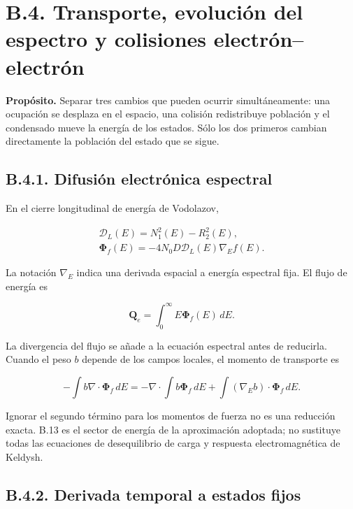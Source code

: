 \documentclass[
  spanish,
  10pt,
  a4paper,
]{article}
\begin{document}
\section{B.4. Transporte, evolución del espectro y colisiones
electrón--electrón}\label{b.4.-transporte-evoluciuxf3n-del-espectro-y-colisiones-electruxf3nelectruxf3n}

\textbf{Propósito.} Separar tres cambios que pueden ocurrir
simultáneamente: una ocupación se desplaza en el espacio, una colisión
redistribuye población y el condensado mueve la energía de los estados.
Sólo los dos primeros cambian directamente la población del estado que
se sigue.

\subsection{B.4.1. Difusión electrónica
espectral}\label{b.4.1.-difusiuxf3n-electruxf3nica-espectral}

En el cierre longitudinal de energía de Vodolazov,

\[
\begin{gathered}
\mathcal D_L(E)=N_1^2(E)-R_2^2(E),\\
\boldsymbol\Phi_f(E)=-4N_0D\mathcal D_L(E)\nabla_E f(E).
\end{gathered} \tag{B.13}
\]

La notación \(\nabla_E\) indica una derivada espacial a energía
espectral fija. El flujo de energía es

\[
\mathbf Q_e=\int_0^\infty E\boldsymbol\Phi_f(E)\,dE.
\tag{B.14}
\]

La divergencia del flujo se añade a la ecuación espectral antes de
reducirla. Cuando el peso \(b\) depende de los campos locales, el
momento de transporte es

\[
-\int b\nabla\cdot\boldsymbol\Phi_f\,dE
=-\nabla\cdot\int b\boldsymbol\Phi_f\,dE
+\int(\nabla_Eb)\cdot\boldsymbol\Phi_f\,dE. \tag{B.15}
\]

Ignorar el segundo término para los momentos de fuerza no es una
reducción exacta. B.13 es el sector de energía de la aproximación
adoptada; no sustituye todas las ecuaciones de desequilibrio de carga y
respuesta electromagnética de Keldysh.

\subsection{B.4.2. Derivada temporal a estados
fijos}\label{b.4.2.-derivada-temporal-a-estados-fijos}
\end{document}

